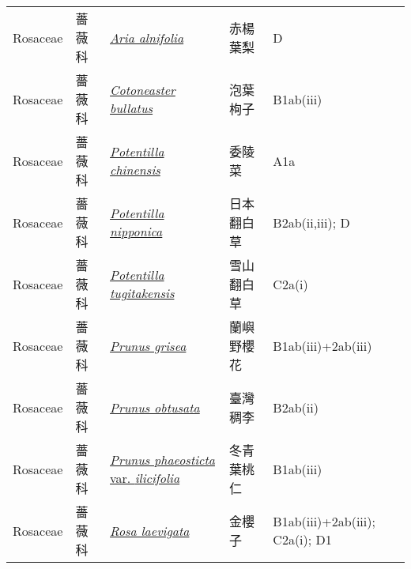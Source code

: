 {\begin{longtable}{L{2.5cm}L{2cm}L{5cm}L{2.5cm}L{3cm}}
    Rosaceae & 薔薇科 & \href{http://www.theplantlist.org/tpl1.1/search?q=Aria+alnifolia}{\textit{Aria alnifolia} } & 赤楊葉梨 & D    \\
    Rosaceae & 薔薇科 & \href{http://www.theplantlist.org/tpl1.1/search?q=Cotoneaster+bullatus}{\textit{Cotoneaster bullatus} } & 泡葉栒子 & B1ab(iii)    \\
    Rosaceae & 薔薇科 & \href{http://www.theplantlist.org/tpl1.1/search?q=Potentilla+chinensis}{\textit{Potentilla chinensis} } & 委陵菜 & A1a    \\
    Rosaceae & 薔薇科 & \href{http://www.theplantlist.org/tpl1.1/search?q=Potentilla+nipponica}{\textit{Potentilla nipponica} } & 日本翻白草 & B2ab(ii,iii); D    \\
    Rosaceae & 薔薇科 & \href{http://www.theplantlist.org/tpl1.1/search?q=Potentilla+tugitakensis}{\textit{Potentilla tugitakensis} } & 雪山翻白草 & C2a(i)    \\
    Rosaceae & 薔薇科 & \href{http://www.theplantlist.org/tpl1.1/search?q=Prunus+grisea}{\textit{Prunus grisea} } & 蘭嶼野櫻花 & B1ab(iii)+2ab(iii)    \\
    Rosaceae & 薔薇科 & \href{http://www.theplantlist.org/tpl1.1/search?q=Prunus+obtusata}{\textit{Prunus obtusata} } & 臺灣稠李 & B2ab(ii)    \\
    Rosaceae & 薔薇科 & \href{http://www.theplantlist.org/tpl1.1/search?q=Prunus+phaeosticta+var.+ilicifolia}{\textit{Prunus phaeosticta} var. \textit{ilicifolia} } & 冬青葉桃仁 & B1ab(iii)    \\
    Rosaceae & 薔薇科 & \href{http://www.theplantlist.org/tpl1.1/search?q=Rosa+laevigata}{\textit{Rosa laevigata} } & 金櫻子 & B1ab(iii)+2ab(iii); C2a(i); D1    \\

\end{longtable}}
